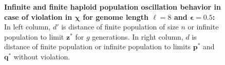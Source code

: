 \begin{figure}[h]
\begin{center}
\hspace{-3em}%
\vspace{-0.5em} \hspace{-3em}%


\caption[\textbf{Infinite and finite haploid population oscillation behavior in case of violation in $\bm{\chi}$ for genome length $\ell = 8$ and $\bm{\epsilon} = 0.5$}]{\textbf{Infinite and finite haploid population oscillation behavior in case of violation in $\bm{\chi}$ for genome length $\ell = 8$ and $\bm{\epsilon} = 0.5$:} 
  In left column, $d'$ is distance of finite population of size $n$ or infinite population to limit $\bm{z}^\ast$ for $g$ generations. In right column, $d$ is distance of finite population or infinite population to limits $\bm{p}^\ast$ and $\bm{q}^\ast$ without violation.}
\label{oscillation_8h_vio_chi_0.5}
\end{center}
\end{figure}


